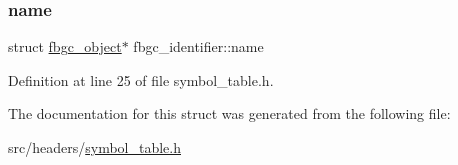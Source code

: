 \mbox{\label{structfbgc__identifier_aa4b055e0f90c3c47b0d9ba08a307c480}} 
\subsubsection{\texorpdfstring{name}{name}}
{\footnotesize\ttfamily struct \hyperlink{structfbgc__object}{fbgc\+\_\+object}$\ast$ fbgc\+\_\+identifier\+::name}



Definition at line 25 of file symbol\+\_\+table.\+h.



The documentation for this struct was generated from the following file\+:\begin{DoxyCompactItemize}
\item 
src/headers/\hyperlink{symbol__table_8h}{symbol\+\_\+table.\+h}\end{DoxyCompactItemize}
